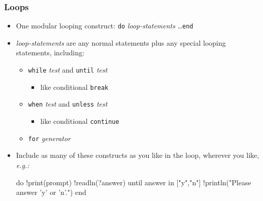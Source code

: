 \documentclass[12pt]{beamer}
\begin{document}
\begin{frame}[fragile]
\frametitle{Loops}
\begin{itemize}
\item One modular looping construct:
  \texttt{do} \emph{loop-statements} \ldots \texttt{end}
\item \emph{loop-statements} are any normal statements plus any
  special looping statements, including:
  \begin{itemize}
  \item \texttt{while} \emph{test} and \texttt{until} \emph{test}
    \begin{itemize}
    \item like conditional \texttt{break}
    \end{itemize}
  \item \texttt{when} \emph{test} and \texttt{unless} \emph{test}
    \begin{itemize}
    \item like conditional \texttt{continue}
    \end{itemize}
  \item \texttt{for} \emph{generator}
  \end{itemize}
\item Include as many of these constructs as you like in the loop,
  wherever you like, \emph{e.g.:} \\
\begin{semiverbatim}
    do  !print(prompt)
        !readln(?answer)
        until answer in ["y","n"]
        !println("Please answer 'y' or 'n'.")
    end
\end{semiverbatim}
\end{itemize}
\end{frame}
\end{document}
